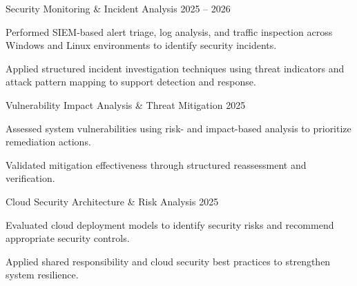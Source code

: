 



\begin{cventries}

  \cventry
    {Security Monitoring \& Incident Analysis}
    {2025 -- 2026}
    {
      \begin{cvitems}
        \item {Performed SIEM-based alert triage, log analysis, and traffic inspection across Windows and Linux environments to identify security incidents.}
        \item {Applied structured incident investigation techniques using threat indicators and attack pattern mapping to support detection and response.}
      \end{cvitems}
    }
    \vspace{4mm}

  \cventry
    {Vulnerability Impact Analysis \& Threat Mitigation}
    {2025}
    {
      \begin{cvitems}
        \item {Assessed system vulnerabilities using risk- and impact-based analysis to prioritize remediation actions.}
        \item {Validated mitigation effectiveness through structured reassessment and verification.}
      \end{cvitems}
    }
    \vspace{4mm}

  \cventry
    {Cloud Security Architecture \& Risk Analysis}
    {2025}
    {
      \begin{cvitems}
        \item {Evaluated cloud deployment models to identify security risks and recommend appropriate security controls.}
        \item {Applied shared responsibility and cloud security best practices to strengthen system resilience.}
      \end{cvitems}
    }
    \vspace{4mm}


\end{cventries}
